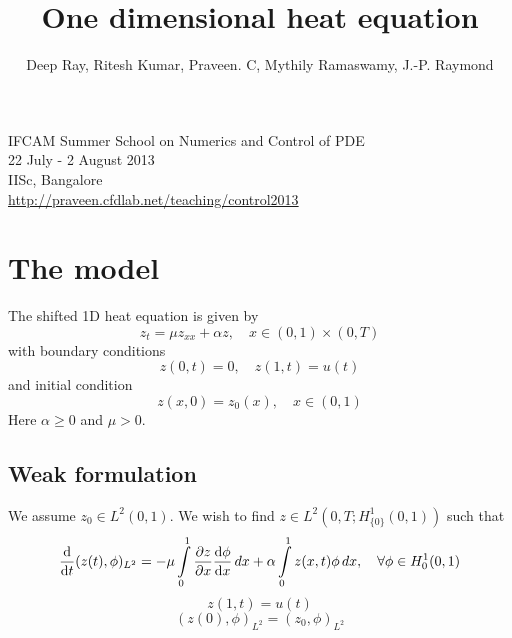 \documentclass[12pt]{article}
\title{One dimensional heat equation}
\author{Deep Ray, Ritesh Kumar, Praveen. C, Mythily Ramaswamy, J.-P. Raymond}
\date{}
\begin{document}
\maketitle
\begin{center}
IFCAM Summer School on Numerics and Control of PDE\\
22 July - 2 August 2013\\
IISc, Bangalore\\
\url{http://praveen.cfdlab.net/teaching/control2013}
\end{center}


\section{The model}
The shifted 1D heat equation is given by
\[
z_t = \mu z_{xx} + \alpha z, \quad x \in (0,1) \times (0,T)
\]
with boundary conditions
\[
z(0,t) = 0, \quad z(1,t) = u(t)
\]
and initial condition
\[
z(x,0) = z_0(x) , \quad x \in (0,1)
\]
Here $\alpha \ge 0$ and $\mu > 0$. 

\subsection{Weak formulation}
We assume $z_0 \in L^2(0,1)$. We wish to find $z \in L^2(0,T;H^1_{\{0\}}(0,1))$ such that
\[
 \frac{\textrm{d} }{\textrm{d} t}(z(t), \phi)_{L^2} = - \mu \int \limits^{1}_{0} \frac{\partial z}{\partial x} \frac{\textrm{d} \phi}{\textrm{d} x} \, dx +  \alpha \int \limits^{1}_{0} z(x,t) \phi \, dx, \quad \forall \phi \in H^1_0(0,1)
\]
\[
 z(1,t) = u(t)
\]
\[
 (z(0),\phi)_{L^2} = (z_0 ,\phi)_{L^2}
\]
\end{document}
